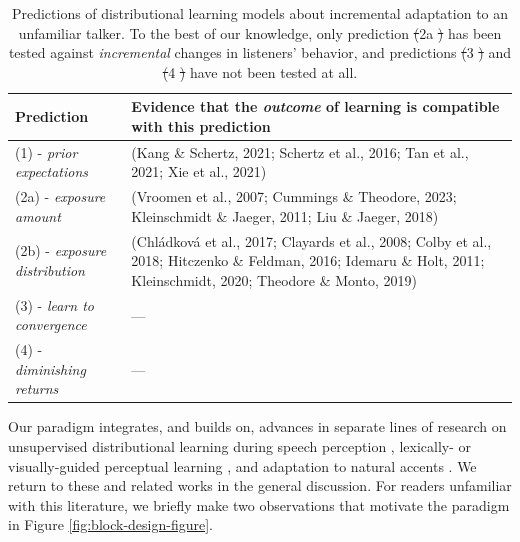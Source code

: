 \documentclass[
  11pt,
  man,mask,floatsintext]{apa6}
\makeatletter
\providecommand{\DIFdel}[1]{{\protect\color{red}\sout{#1}}} %
\providecommand{\DIFaddbegin}{} %
\providecommand{\DIFaddend}{} %
\providecommand{\DIFdelbegin}{} %
\providecommand{\DIFdelend}{} %
\providecommand{\DIFdelFL}[1]{\DIFdel{#1}} %
\providecommand{\DIFdelbeginFL}{} %
\providecommand{\DIFdelendFL}{} %
\newcommand{\DIFscaledelfig}{0.5}
\newlength{\DIFdelgraphicswidth} %
\newlength{\DIFdelgraphicsheight} %
\newcommand{\DIFaddincludegraphics}[2][]{{\color{blue}\fbox{\DIFOincludegraphics[#1]{#2}}}} %
\newcommand{\DIFdelincludegraphics}[2][]{%
\sbox{\DIFdelgraphicsbox}{\DIFOincludegraphics[#1]{#2}}%
\settoboxwidth{\DIFdelgraphicswidth}{\DIFdelgraphicsbox} %
\settoboxtotalheight{\DIFdelgraphicsheight}{\DIFdelgraphicsbox} %
\scalebox{\DIFscaledelfig}{%
\parbox[b]{\DIFdelgraphicswidth}{\usebox{\DIFdelgraphicsbox}\\[-\baselineskip] \rule{\DIFdelgraphicswidth}{0em}}\llap{\resizebox{\DIFdelgraphicswidth}{\DIFdelgraphicsheight}{%
\setlength{\unitlength}{\DIFdelgraphicswidth}%
\begin{picture}(1,1)%
\thicklines\linethickness{2pt} %
{\color[rgb]{1,0,0}\put(0,0){\framebox(1,1){}}}%
{\color[rgb]{1,0,0}\put(0,0){\line( 1,1){1}}}%
{\color[rgb]{1,0,0}\put(0,1){\line(1,-1){1}}}%
\end{picture}%
}\hspace*{3pt}}} %
} %
\DeclareRobustCommand{\DIFaddbegin}{\DIFOaddbegin \let\includegraphics\DIFaddincludegraphics} %
\DeclareRobustCommand{\DIFaddend}{\DIFOaddend \let\includegraphics\DIFOincludegraphics} %
\DeclareRobustCommand{\DIFdelbegin}{\DIFOdelbegin \let\includegraphics\DIFdelincludegraphics} %
\DeclareRobustCommand{\DIFdelend}{\DIFOaddend \let\includegraphics\DIFOincludegraphics} %
\DeclareRobustCommand{\DIFdelbeginFL}{\DIFOdelbeginFL \let\includegraphics\DIFdelincludegraphics} %
\DeclareRobustCommand{\DIFdelendFL}{\DIFOaddendFL \let\includegraphics\DIFOincludegraphics} %
\let\sout@orig\sout %
\renewcommand{\sout}[1]{\ifmmode\text{\sout@orig{\ensuremath{#1}}}\else\sout@orig{#1}\fi} %
\makeatother
\begin{document}
\begin{table}[!ht]
\begin{small}
\begin{tabular}{p{}p{}}
\hline
Prediction & Evidence that the {\em outcome} of learning is compatible with this prediction \\
\hline
(1) - {\em prior expectations} & (Kang \& Schertz, 2021; Schertz et al., 2016; Tan et al., 2021; Xie et al., 2021) \\

(2a) - {\em exposure amount}  & (Vroomen et al., 2007; Cummings \& Theodore, 2023; Kleinschmidt \& Jaeger, 2011; Liu \& Jaeger, 2018) \\

(2b) - {\em exposure distribution} & (Chl\'adkov\'a et al., 2017; Clayards et al., 2008; Colby et al., 2018; Hitczenko \& Feldman, 2016; Idemaru \& Holt, 2011; Kleinschmidt, 2020; Theodore \& Monto, 2019) \\

(3) - {\em learn to convergence}  & --- \\

(4) - {\em diminishing returns} & --- \\

\hline
\end{tabular}
\caption{Predictions of distributional learning models about incremental adaptation to an unfamiliar talker. To the best of our knowledge, only prediction \DIFdelbeginFL \DIFdelFL{(}\DIFdelendFL 2a \DIFdelbeginFL \DIFdelFL{) }\DIFdelendFL has been tested against {\em incremental} changes in listeners' behavior, and predictions \DIFdelbeginFL \DIFdelFL{(}\DIFdelendFL 3 \DIFdelbeginFL \DIFdelFL{) }\DIFdelendFL and \DIFdelbeginFL \DIFdelFL{(}\DIFdelendFL 4 \DIFdelbeginFL \DIFdelFL{) }\DIFdelendFL have not been tested at all.}
\label{tab:predictions}
\end{small}
\end{table}

Our paradigm integrates, and builds on, advances in separate lines of research on unsupervised distributional learning during speech perception \autocite{clayards2008,colby2018,kleinschmidt2020,theodore-monto2019}, lexically- or visually-guided perceptual learning \DIFdelbegin %
\DIFdelend \DIFaddbegin \autocites[LGPL/VGPL,][]{cummings-theodore2023,kleinschmidt-jaeger2012,vroomen2007}\DIFaddend , and adaptation to natural accents \autocite{hitczenko-feldman2016,tan2021,xie2021cognition}. We return to these and related works in the general discussion. For readers unfamiliar with this literature, we briefly make two observations that motivate the paradigm in Figure \ref{fig:block-design-figure}.
\end{document}
